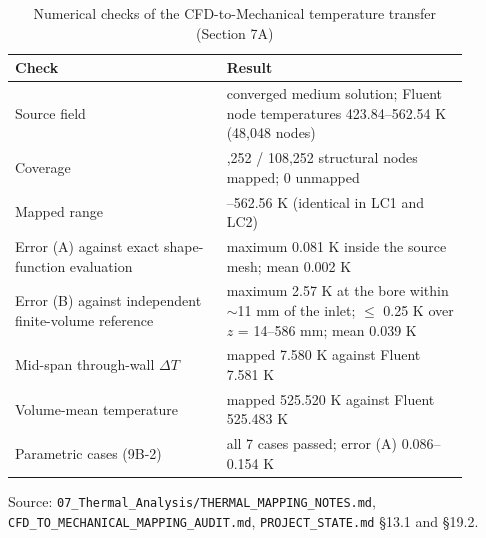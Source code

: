 \begin{table}[htbp]
\centering
\footnotesize
\caption{Numerical checks of the CFD-to-Mechanical temperature transfer (Section 7A)}
\label{tab:mapping}
\begin{tabular}{>{\raggedright\arraybackslash}p{0.42\linewidth}>{\raggedright\arraybackslash}p{0.48\linewidth}}
\toprule
Check & Result \\
\midrule
Source field & converged medium solution; Fluent node temperatures 423.84--562.54 K (48,048 nodes) \\
Coverage & 108,252 / 108,252 structural nodes mapped; 0 unmapped \\
Mapped range & 423.84--562.56 K (identical in LC1 and LC2) \\
Error (A) against exact shape-function evaluation & maximum 0.081 K inside the source mesh; mean 0.002 K \\
Error (B) against independent finite-volume reference & maximum 2.57 K at the bore within $\sim$11 mm of the inlet; $\le$ 0.25 K over $z$ = 14--586 mm; mean 0.039 K \\
Mid-span through-wall $\Delta T$ & mapped 7.580 K against Fluent 7.581 K \\
Volume-mean temperature & mapped 525.520 K against Fluent 525.483 K \\
Parametric cases (9B-2) & all 7 cases passed; error (A) 0.086--0.154 K \\
\bottomrule
\end{tabular}
\par\smallskip\parbox{\linewidth}{\footnotesize\raggedright Source: \texttt{07\_Thermal\_Analysis/THERMAL\_MAPPING\_NOTES.md}, \texttt{CFD\_TO\_MECHANICAL\_MAPPING\_AUDIT.md}, \texttt{PROJECT\_STATE.md} \S13.1 and \S19.2.}
\end{table}
